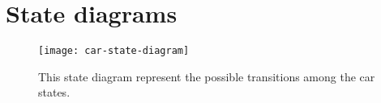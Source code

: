\section{State diagrams}

\begin{figure}[H]
	\centering
	\texttt{[image: car-state-diagram]}
	\caption[State diagram - Car states]{This state diagram represent the possible transitions among the car states.}
	\label{fig:car-state-diagram}
\end{figure}